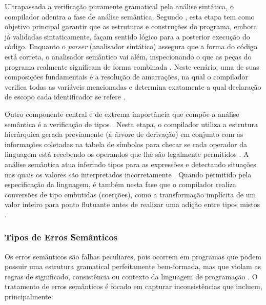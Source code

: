 Ultrapassada a verificação puramente gramatical pela análise sintática, o compilador adentra a fase de análise semântica. Segundo , esta etapa tem como objetivo principal garantir que as estruturas e construções do programa, embora já validadas sintaticamente, façam sentido lógico para a posterior execução do código. %
Enquanto o \textit{parser} (analisador sintático) assegura que a forma do código está correta, o analisador semântico vai além, inspecionando o que as peças do programa realmente significam de forma combinada \cite{nystrom2021}. %
Neste cenário, uma de suas composições fundamentais é a resolução de amarrações, na qual o compilador verifica todas as variáveis mencionadas e determina exatamente a qual declaração de escopo cada identificador se refere \cite{nystrom2021}. %

Outro componente central e de extrema importância que compõe a análise semântica é a verificação de tipos \cite{aho1995, cooper2012}. %
Nesta etapa, o compilador utiliza a estrutura hierárquica gerada previamente (a árvore de derivação) em conjunto com as informações coletadas na tabela de símbolos para checar se cada operador da linguagem está recebendo os operandos que lhe são legalmente permitidos \cite{aho1995}. %
A análise semântica atua inferindo tipos para as expressões e detectando situações nas quais os valores são interpretados incorretamente \cite{cooper2012}. %
Quando permitido pela especificação da linguagem, é também nesta fase que o compilador realiza conversões de tipo embutidas (coerções), como a transformação implícita de um valor inteiro para ponto flutuante antes de realizar uma adição entre tipos mistos \cite{aho1995, cooper2012}. %

\subsubsection*{Tipos de Erros Semânticos}

Os erros semânticos são falhas peculiares, pois ocorrem em programas que podem possuir uma estrutura gramatical perfeitamente bem-formada, mas que violam as regras de significado, consistência ou contexto da linguagem de programação \cite{aho1995, cooper2012}. %
O tratamento de erros semânticos é focado em capturar inconsistências que incluem, principalmente:

